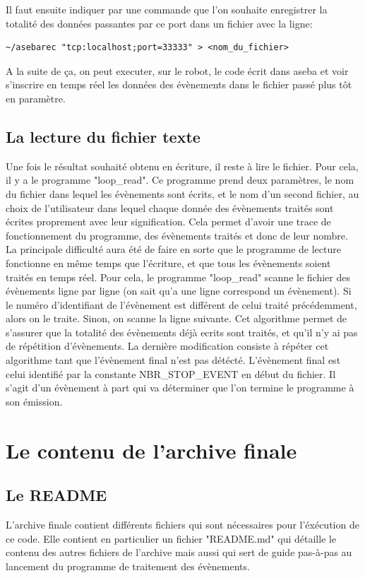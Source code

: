 \documentclass[a4paper, 12pt]{report}
\begin{document}
Il faut ensuite indiquer par une commande que l'on souhaite enregistrer la totalité des données passantes par ce port dans un fichier avec la ligne:
\begin{verbatim}
~/asebarec "tcp:localhost;port=33333" > <nom_du_fichier>
\end{verbatim}
 

A la suite de ça, on peut executer, sur le robot, le code écrit dans aseba et voir s'inscrire en temps réel les données des évènements dans le fichier passé plus tôt en paramètre.

\section{La lecture du fichier texte}
Une fois le résultat souhaité obtenu en écriture, il reste à lire le fichier. Pour cela, il y a le programme "loop\_read". Ce programme prend deux paramètres, le nom du fichier dans lequel les évènements sont écrits, et le nom d'un second fichier, au choix de l'utilisateur dans lequel chaque donnée des évènements traités sont écrites proprement avec leur signification. Cela permet d'avoir une trace de fonctionnement du programme, des évènements traités et donc de leur nombre.\\
La principale difficulté aura été de faire en sorte que le programme de lecture fonctionne en même temps que l'écriture, et que tous les évènements soient traités en temps réel. Pour cela, le programme "loop\_read" scanne le fichier des évènements ligne par ligne (on sait qu'a une ligne correspond un évènement). Si le numéro d'identifiant de l'évènement est différent de celui traité précédemment, alors on le traite. Sinon, on scanne la ligne suivante. Cet algorithme permet de s'assurer que la totalité des évènements déjà ecrits sont traités, et qu'il n'y ai pas de répétition d'évènements. La dernière modification consiste à répéter cet algorithme tant que l'évènement final n'est pas détécté. L'évènement final est celui identifié par la constante NBR\_STOP\_EVENT en début du fichier. Il s'agit d'un évènement à part qui va déterminer que l'on termine le programme à son émission.


\chapter{Le contenu de l'archive finale}
\section{Le README}
L'archive finale contient différents fichiers qui sont nécessaires pour l'éxécution de ce code. Elle contient en particulier un fichier "README.md" qui détaille le contenu des autres fichiers de l'archive mais aussi qui sert de guide pas-à-pas au lancement du programme de traitement des évènements.
\end{document}
